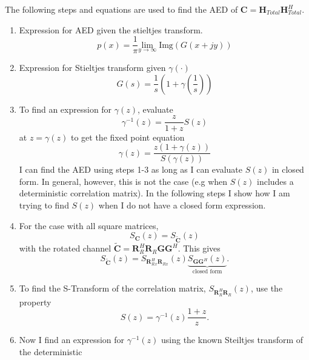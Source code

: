\documentclass[12pt,a4paper]{report}
\begin{document}
	The following steps and equations are used to find the AED of $\mathbf{C} = \mathbf{H}_{Total} \mathbf{H}_{Total}^H$.
	\begin{enumerate}
	\item 
		Expression for AED given the stieltjes transform.
		\begin{equation}
		p(x) = \frac{1}{\pi} \underset{y \rightarrow \infty}{\text{lim}} \; \text{Img}(G(x+jy))
		\end{equation}
	\item 
		Expression for  Stieltjes transform given $\gamma\left(\cdot \right)$
		\begin{equation}
		G(s)=  \frac{1}{s} (1+\gamma\left(\frac{1}{s}\right))
		\end{equation}
	\item 
		To find an expression for $\gamma(z)$, evaluate 
		\begin{equation}
		\gamma^{-1}(z) =  \frac{z}{1+z} S(z)
		\end{equation}
		at $z= \gamma(z)$
		to get the fixed point equation
		\begin{equation}
		\gamma(z) = \frac{z(1+ \gamma(z))}{S(\gamma(z))}
		\end{equation}
		I can find the AED using steps 1-3 as long as I can evaluate $S(z)$ in closed form. 
		In general, however, this is not the case (e.g when $S(z)$ includes a deterministic correlation matrix). 
		In the following steps I show how I am trying to find $S(z)$ when I do not have a closed form expression. 
	\item 
		For the case with all square matrices, 
		\begin{equation}\label{rotation_property}
		S_{\mathbf{C}}(z) =  S_{\tilde{\mathbf{C}}}\left(z\right)
		\end{equation}
		with the rotated channel $\tilde{\mathbf{C}} = \mathbf{R}_{R}^H\mathbf{R}_{R}\mathbf{G}\mathbf{G}^H$.
		This gives
		\begin{equation}
		S_{\tilde{\mathbf{C}}}\left( z \right) = S_ {\mathbf{R}_{Rx}^H\mathbf{R}_{Rx}}(z)
		\underbrace{S_ {\mathbf{G}\mathbf{G}^H}(z)}_{\text{closed form}}.
		\end{equation}
	\item 
		To find the S-Transform of the correlation matrix, $S_ {\mathbf{R}_{R}^H\mathbf{R}_{R}}(z)$,
		use the property 
		\begin{equation}
		 S(z) = \gamma^{-1}(z)\frac{1+z}{z}.
		\end{equation}
	\item
		Now I find an expression for $\gamma^{-1}(z)$ using the known Steiltjes transform of the deterministic

\end{enumerate}
\end{document}
